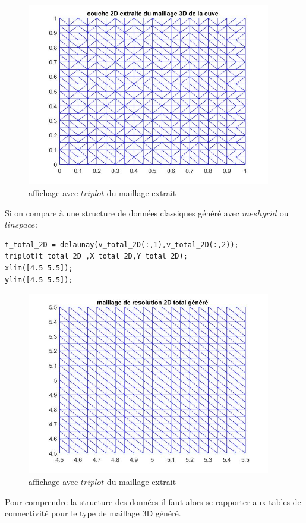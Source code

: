 \documentclass[a4paper,12pt,titlepage]{report}
\begin{document}
\begin{onehalfspace}
\begin{figure}[!h]
	\center
	\includegraphics[height = 8cm, keepaspectratio]{graphes/affichage_extraction_2D.jpg}
	\caption{\label{figure 3 } affichage avec $triplot$ du maillage extrait}
\end{figure}
Si on compare à une structure de données classiques généré avec $meshgrid$ ou $linspace$:
\begin{verbatim}
t_total_2D = delaunay(v_total_2D(:,1),v_total_2D(:,2)); 
triplot(t_total_2D ,X_total_2D,Y_total_2D);
xlim([4.5 5.5]);
ylim([4.5 5.5]);
\end{verbatim} 
\begin{figure}[!h]
	\center
	\includegraphics[height = 8cm, keepaspectratio]{graphes/affichage_extraction_2D_normal.jpg}
	\caption{\label{figure 3 } affichage avec $triplot$ du maillage extrait}
\end{figure}
\newpage
Pour comprendre la structure des données il faut alors se rapporter  aux tables de connectivité pour le type de maillage 3D généré.
\begin{figure}[h]

\end{figure}
\end{onehalfspace}
\end{document}
